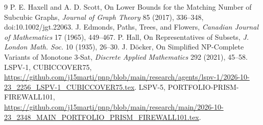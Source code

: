\documentclass[11pt]{article}
\begin{document}
\begin{thebibliography}{9}
 P. E. Haxell and A. D. Scott, On Lower Bounds for the Matching Number of Subcubic Graphs, \emph{Journal of Graph Theory} 85 (2017), 336--348, doi:10.1002/jgt.22063.
 J. Edmonds, Paths, Trees, and Flowers, \emph{Canadian Journal of Mathematics} 17 (1965), 449--467.
 P. Hall, On Representatives of Subsets, \emph{J. London Math. Soc.} 10 (1935), 26--30.
 J. D\"ocker, On Simplified NP-Complete Variants of Monotone 3-Sat, \emph{Discrete Applied Mathematics} 292 (2021), 45--58.
 LSPV-1, CUBICCOVER75, \url{https://github.com/j15marti/pnp/blob/main/research/agents/lspv-1/2026-10-23_2256_LSPV-1_CUBICCOVER75.tex}.
 LSPV-5, PORTFOLIO-PRISM-FIREWALL101, \url{https://github.com/j15marti/pnp/blob/main/research/main/2026-10-23_2348_MAIN_PORTFOLIO_PRISM_FIREWALL101.tex}.
\end{thebibliography}
\end{document}
